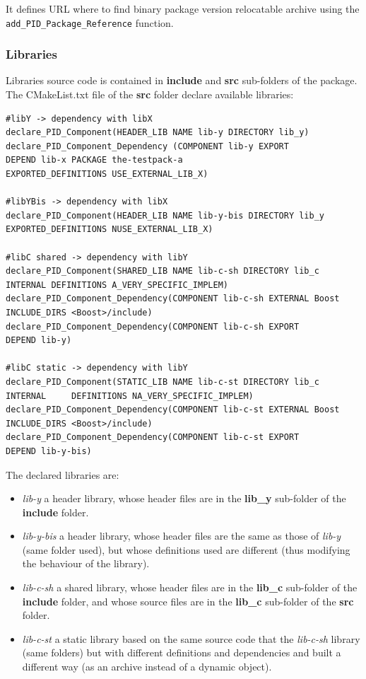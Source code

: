\documentclass[12pt,a4paper]{article}
\begin{document}
It defines URL where to find binary package version relocatable archive using the \texttt{add\_PID\_Package\_Reference} function.

\subsubsection{Libraries}

Libraries source code is contained in \textbf{include} and \textbf{src} sub-folders of the package. The CMakeList.txt file of the \textbf{src} folder declare available libraries:

\begin{verbatim}
#libY -> dependency with libX
declare_PID_Component(HEADER_LIB NAME lib-y DIRECTORY lib_y)
declare_PID_Component_Dependency (COMPONENT lib-y EXPORT 
DEPEND lib-x PACKAGE the-testpack-a
EXPORTED_DEFINITIONS USE_EXTERNAL_LIB_X)

#libYBis -> dependency with libX
declare_PID_Component(HEADER_LIB NAME lib-y-bis DIRECTORY lib_y
EXPORTED_DEFINITIONS NUSE_EXTERNAL_LIB_X)

#libC shared -> dependency with libY
declare_PID_Component(SHARED_LIB NAME lib-c-sh DIRECTORY lib_c
INTERNAL DEFINITIONS A_VERY_SPECIFIC_IMPLEM)
declare_PID_Component_Dependency(COMPONENT lib-c-sh EXTERNAL Boost 
INCLUDE_DIRS <Boost>/include)
declare_PID_Component_Dependency(COMPONENT lib-c-sh EXPORT 
DEPEND lib-y)

#libC static -> dependency with libY
declare_PID_Component(STATIC_LIB NAME lib-c-st DIRECTORY lib_c
INTERNAL	 DEFINITIONS NA_VERY_SPECIFIC_IMPLEM)
declare_PID_Component_Dependency(COMPONENT lib-c-st EXTERNAL Boost 
INCLUDE_DIRS <Boost>/include)
declare_PID_Component_Dependency(COMPONENT lib-c-st EXPORT 
DEPEND lib-y-bis)
\end{verbatim}

The declared libraries are:
\begin{itemize}
\item \textit{lib-y} a header library, whose header files are in the \textbf{lib\_y} sub-folder of the \textbf{include} folder.
\item \textit{lib-y-bis} a header library, whose header files are the same as those of \textit{lib-y} (same folder used), but whose definitions used are different (thus modifying the behaviour of the library).
\item \textit{lib-c-sh} a shared library, whose header files are in the \textbf{lib\_c} sub-folder of the \textbf{include} folder, and whose source files are in the \textbf{lib\_c} sub-folder of the \textbf{src} folder.
\item \textit{lib-c-st} a static library based on the same source code that the \textit{lib-c-sh} library (same folders) but with different definitions and dependencies and built a different way (as an archive instead of a dynamic object).
\end{itemize}
\end{document}
